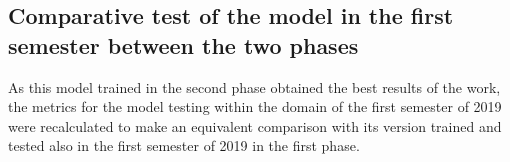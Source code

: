         \begin{figure}[H]
        \end{figure}

     

    
        \begin{figure}[H]
        \end{figure}
    

    \subsection{Comparative test of the model in the first semester between the two phases}
    
        As this model trained in the second phase obtained the best results of the work, the metrics for the model testing within the domain of the first semester of 2019 were recalculated to make an equivalent comparison with its version trained and tested also in the first semester of 2019 in the first phase.
        
